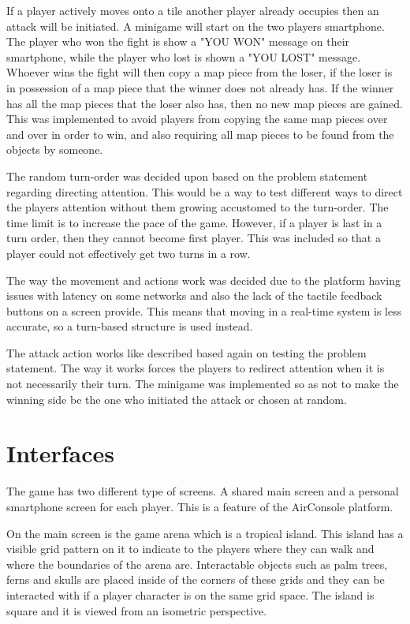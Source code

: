 If a player actively moves onto a tile another player already occupies then an attack will be initiated. A minigame will start on the two players smartphone. The player who won the fight is show a "YOU WON" message on their smartphone, while the player who lost is shown a "YOU LOST" message. Whoever wins the fight will then copy a map piece from the loser, if the loser is in possession of a map piece that the winner does not already has. If the winner has all the map pieces that the loser also has, then no new map pieces are gained. This was implemented to avoid players from copying the same map pieces over and over in order to win, and also requiring all map pieces to be found from the objects by someone.

The random turn-order was decided upon based on the problem statement regarding directing attention. This would be a way to test different ways to direct the players attention without them growing accustomed to the turn-order. The time limit is to increase the pace of the game. However, if a player is last in a turn order, then they cannot become first player. This was included so that a player could not effectively get two turns in a row.

The way the movement and actions work was decided due to the platform having issues with latency on some networks and also the lack of the tactile feedback buttons on a screen provide. This means that moving in a real-time system is less accurate, so a turn-based structure is used instead.

The attack action works like described based again on testing the problem statement. The way it works forces the players to redirect attention when it is not necessarily their turn. The minigame was implemented so as not to make the winning side be the one who initiated the attack or chosen at random.

\section{Interfaces}
The game has two different type of screens. A shared main screen and a personal smartphone screen for each player. This is a feature of the AirConsole platform.

On the main screen is the game arena which is a tropical island. This island has a visible grid pattern on it to indicate to the players where they can walk and where the boundaries of the arena are. Interactable objects such as palm trees, ferns and skulls are placed inside of the corners of these grids and they can be interacted with if a player character is on the same grid space. The island is square and it is viewed from an isometric perspective. 

